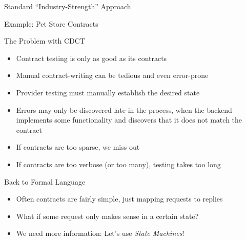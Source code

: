 \begin{frame}[fragile]{Standard ``Industry-Strength'' Approach}

\end{frame}

\begin{frame}[fragile]{Example: Pet Store Contracts}



\end{frame}

\begin{frame}[fragile]{The Problem with CDCT}

\begin{itemize}[<+->]
\item Contract testing is only as good as its contracts
\item Manual contract-writing can be tedious and even error-prone
\item Provider testing must manually establish the desired state
\item Errors may only be discovered late in the process, when the backend implements some functionality and discovers that it does not match the contract
\item If contracts are too sparse, we miss out
\item If contracts are too verbose (or too many), testing takes too long
\end{itemize}

\end{frame}

\begin{frame}[fragile]{Back to Formal Language}
  \begin{itemize}[<+->]
  \item Often contracts are fairly simple, just mapping requests to replies
  \item What if some request only makes sense in a certain state?
  \item We need more information: Let's use \emph{State Machines}!
  \end{itemize}
\end{frame}


